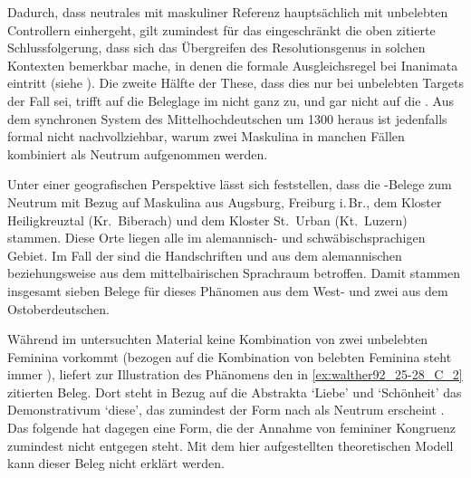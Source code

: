 Dadurch, dass neutrales  mit maskuliner Referenz hauptsächlich mit
unbelebten Controllern einhergeht, gilt zumindest für das \CAO{}
eingeschränkt die oben zitierte Schlussfolgerung, dass sich das Übergreifen des
Resolutionsgenus in solchen Kontexten bemerkbar mache, in denen die formale
Ausgleichsregel bei Inanimata eintritt (siehe ). Die
zweite Hälfte der These, dass dies nur bei unbelebten Targets der Fall sei,
trifft auf die Beleglage im \CAO{} nicht ganz zu, und gar nicht auf
die \KC{}. Aus dem synchronen System des Mittelhochdeutschen um 1300
heraus ist jedenfalls formal nicht nachvollziehbar, warum zwei Maskulina in
manchen Fällen kombiniert als Neutrum aufgenommen werden.

Unter einer geografischen Perspektive lässt sich feststellen, dass die
\CAO{}-Belege zum Neutrum mit Bezug auf Maskulina aus Augsburg,
Freiburg i.\,Br., dem Kloster Heiligkreuztal (Kr.~Biberach) und dem Kloster
St.~Urban (Kt.~Luzern) stammen. Diese Orte liegen alle im alemannisch- und
schwäbischsprachigen Gebiet. Im Fall der \KC{} sind die Handschriften
\citet{kc:K} und \citet{kc:B1} aus dem alemannischen beziehungsweise aus dem
mittelbairischen Sprachraum betroffen. Damit stammen insgesamt sieben Belege
für dieses Phänomen aus dem West- und zwei aus dem Ost\-ober\-deutschen.

Während im untersuchten Material keine Kombination von zwei unbelebten Feminina
vorkommt (bezogen auf die Kombination von belebten Feminina steht immer
), liefert \citet[384]{paul2007} zur Illustration des Phänomens
den in \cref{ex:walther92_25-28_C_2} zitierten Beleg. Dort steht in Bezug auf
die Abstrakta  `Liebe' und  `Schönheit' das
Demonstrativum  `diese', das zumindest der Form nach als
Neutrum erscheint \autocite[485]{ksw2}. Das folgende  hat dagegen
eine Form, die der Annahme von femininer Kongruenz zumindest nicht entgegen
steht. Mit dem hier aufgestellten theoretischen Modell kann dieser Beleg nicht
erklärt werden.

